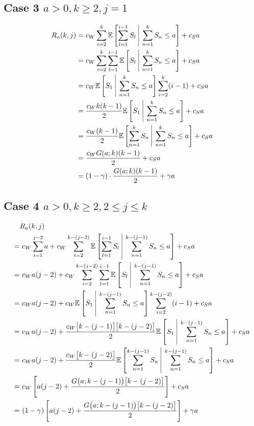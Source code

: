 \subsection{Case 3 $a > 0, k \geq 2, j = 1$}
\begin{align*}
	R_{a} (k, j) & = c_{W} \sum_{i = 2}^{k} \mathbb{E} \left[ \sum_{l = 1}^{i - 1} S_{l} \ \vline \ \sum_{n = 1}^{k} S_{n} \leq a \right] + c_{S} a \\
	& = c_{W} \sum_{i = 2}^{k} \sum_{l = 1}^{i - 1} \mathbb{E} \left[ S_{l} \ \vline \ \sum_{n = 1}^{k} S_{n} \leq a \right] + c_{S} a \\
	& = c_{W} \mathbb{E} \left[ S_{1} \ \vline \ \sum_{n = 1}^{k} S_{n} \leq a \right] \sum_{i = 2}^{k} (i - 1) + c_{S} a \\
	& = \frac{c_{W} k (k - 1)}{2} \mathbb{E} \left[ S_{1} \ \vline \ \sum_{n = 1}^{k} S_{n} \leq a \right] + c_{S} a \\
	& = \frac{c_{W} (k - 1)}{2} \mathbb{E} \left[ \sum_{n = 1}^{k} S_{n} \ \vline \ \sum_{n = 1}^{k} S_{n} \leq a \right] + c_{S} a \\
	& = \frac{c_{W} G (a; k) (k - 1)}{2} + c_{S} a \\
	& = (1 - \gamma) \cdot \frac{G (a; k) (k - 1)}{2} + \gamma a
\end{align*}

\subsection{Case 4 $a > 0, k \geq 2, 2 \leq j \leq k$}
\begin{align*}
	& R_{a} (k, j) \\
	= & \ c_{W} \sum_{i = 1}^{j - 2} a + c_{W} \sum_{i = 2}^{k - (j - 2)} \mathbb{E} \left[ \sum_{l = 1}^{i - 1} S_{l} \ \vline \ \sum_{n = 1}^{k - (j - 1)} S_{n} \leq a \right] + c_{S} a \\
	= & \ c_{W} a (j - 2) + c_{W} \sum_{i = 2}^{k - (j - 2)} \sum_{l = 1}^{i - 1} \mathbb{E} \left[ S_{l} \ \vline \ \sum_{n = 1}^{k - (j - 1)} S_{n} \leq a \right] + c_{S} a \\
	= & \ c_{W} a (j - 2) + c_{W} \mathbb{E} \left[ S_{1} \ \vline \ \sum_{n = 1}^{k - (j - 1)} S_{n} \leq a \right] \sum_{i = 2}^{k - (j - 2)} (i - 1) + c_{S} a \\
	= & \ c_{W} a (j - 2) + \frac{c_{W} \big[ k - (j - 1) \big] \big[ k - (j - 2) \big]}{2} \mathbb{E} \left[ S_{1} \ \vline \ \sum_{n = 1}^{k - (j - 1)} S_{n} \leq a \right] + c_{S} a \\
	= & \ c_{W} a (j - 2) + \frac{c_{W} \big[ k - (j - 2) \big]}{2} \mathbb{E} \left[ \sum_{n = 1}^{k - (j - 1)} S_{n} \ \vline \ \sum_{n = 1}^{k - (j - 1)} S_{n} \leq a \right] + c_{S} a \\
	= & \ c_{W} \left[ a (j - 2) + \frac{G \big( a; k - (j - 1) \big) \big[ k - (j - 2) \big]}{2} \right] + c_{S} a \\
	= & \ (1 - \gamma) \left[ a (j - 2) + \frac{G \big( a; k - (j - 1) \big) \big[ k - (j - 2) \big]}{2} \right] + \gamma a
\end{align*}

